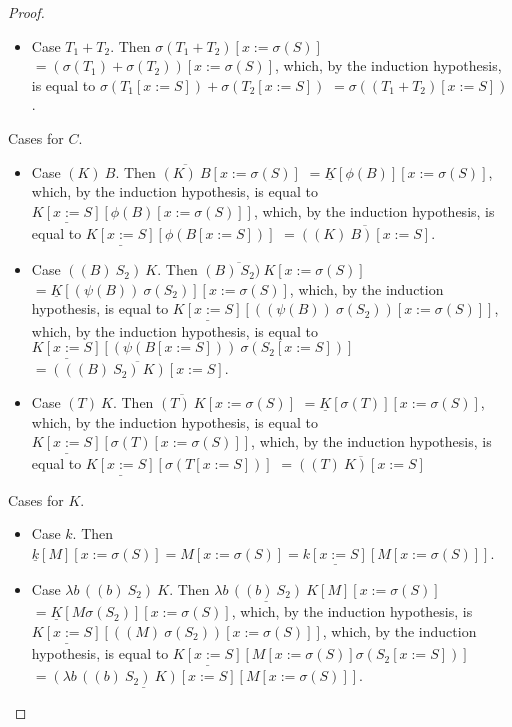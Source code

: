 \documentclass{LMCS}
\begin{document}
\begin{proof}
\begin{myenumerate}
\begin{itemize}
	\item Case $T_{1}+T_{2}$. Then 
	  $\sigma(T_{1}+T_{2})[x:=\sigma(S)]$
	  $=(\sigma(T_{1})+\sigma(T_{2}))[x:=\sigma(S)]$,
	  which, by the induction hypothesis, is equal to
	  $\sigma(T_{1}[x:=S])+\sigma(T_{2}[x:=S])$
	  $=\sigma((T_{1}+T_{2})[x:=S])$.
      \end{itemize}
    \item Cases for $C$.
      \begin{itemize}
	\item Case $(K)~B$. Then 
	  $\overline{(K)~B}[x:=\sigma(S)]$
	  $=\underline{K}[\phi(B)][x:=\sigma(S)]$,
	  which, by the induction hypothesis, is equal to
	  $\underline{K[x:=S]}[\phi(B)[x:=\sigma(S)]]$,
	  which, by the induction hypothesis, is equal to
	  $\underline{K[x:=S]}[\phi(B[x:=S])]$
	  $=\overline{((K)~B)[x:=S]}$.

	\item Case $((B)~S_{2})~K$. Then
	  $\overline{(B)~S_{2})~K}[x:=\sigma(S)]$
	  $=\underline{K}[(\psi(B))~\sigma(S_{2})][x:=\sigma(S)]$,
	  which, by the induction hypothesis, is equal to
	  $\underline{K[x:=S]}[((\psi(B))~\sigma(S_{2}))[x:=\sigma(S)]]$,
	  which, by the induction hypothesis, is equal to
	  $\underline{K[x:=S]}[(\psi(B[x:=S]))~\sigma(S_{2}[x:=S])]$
	  $=\overline{(((B)~S_{2})~K)[x:=S]}$.

	\item Case $(T)~K$. Then 
	  $\overline{(T)~K}[x:=\sigma(S)]$
	  $=\underline{K}[\sigma(T)][x:=\sigma(S)]$,
	  which, by the induction hypothesis, is equal to
	  $\underline{K[x:=S]}[\sigma(T)[x:=\sigma(S)]]$,
	  which, by the induction hypothesis, is equal to
	  $\underline{K[x:=S]}[\sigma(T[x:=S])]$
	  $=\overline{((T)~K)[x:=S]}$
      \end{itemize}
    \item Cases for $K$.
      \begin{itemize}
	\item Case $k$. Then $\underline{k}[M][x:=\sigma(S)]=M[x:=\sigma(S)]=\underline{k[x:=S]}[M[x:=\sigma(S)]]$.
	\item Case $\lambda b\,((b)~S_{2})~K$. Then 
	  $\underline{\lambda b\,((b)~S_{2})~K}[M][x:=\sigma(S)]$
	  $=\underline{K}[M\sigma(S_{2})][x:=\sigma(S)]$,
	  which, by the induction hypothesis, is 
	  $\underline{K[x:=S]}[((M)~\sigma(S_{2}))[x:=\sigma(S)]]$,
	  which, by the induction hypothesis, is equal to
	  $\underline{K[x:=S]}[M[x:=\sigma(S)]\sigma(S_{2}[x:=S])]$
	  $=\underline{(\lambda b\,((b)~S_{2})~K)[x:=S]}[M[x:=\sigma(S)]]$.
	  \qedhere
      \end{itemize}
  \end{myenumerate}
\end{proof}
\end{document}
